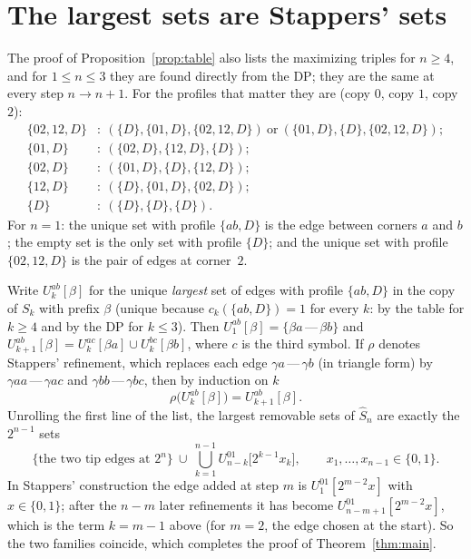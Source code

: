 \documentclass[11pt]{amsart}
\theoremstyle{remark}
\newcommand{\Sh}{\widehat S}
\begin{document}
\section{The largest sets are Stappers' sets}
The proof of Proposition~\ref{prop:table} also lists the maximizing triples for $n\ge4$, and for $1\le n\le3$
they are found directly from the DP; they are the same at every step $n\to n+1$. For the profiles that matter
they are (copy $0$, copy $1$, copy $2$):
\begin{align*}
\{02,12,D\}&:\ (\{D\},\{01,D\},\{02,12,D\})\ \text{or}\ (\{01,D\},\{D\},\{02,12,D\});\\
\{01,D\}&:\ (\{02,D\},\{12,D\},\{D\});\\
\{02,D\}&:\ (\{01,D\},\{D\},\{12,D\});\\
\{12,D\}&:\ (\{D\},\{01,D\},\{02,D\});\\
\{D\}&:\ (\{D\},\{D\},\{D\}).
\end{align*}
For $n=1$: the unique set with profile $\{ab,D\}$ is the edge between corners $a$ and $b$; the empty set is the only
set with profile $\{D\}$; and the unique set with profile $\{02,12,D\}$ is the pair of edges at corner~$2$.

Write $U^{ab}_k[\beta]$ for the unique \emph{largest} set of edges with profile $\{ab,D\}$ in the copy of $S_k$ with
prefix $\beta$ (unique because $c_k(\{ab,D\})=1$ for every $k$: by the table for $k\ge4$ and by the DP for $k\le3$).
Then $U^{ab}_1[\beta]=\{\beta a\,\text{---}\,\beta b\}$ and
$U^{ab}_{k+1}[\beta]=U^{ac}_k[\beta a]\cup U^{bc}_k[\beta b]$, where $c$ is the third symbol. If $\rho$ denotes
Stappers' refinement, which replaces each edge $\gamma a\,\text{---}\,\gamma b$ (in triangle form) by
$\gamma aa\,\text{---}\,\gamma ac$ and $\gamma bb\,\text{---}\,\gamma bc$, then by induction on $k$
\[\rho\bigl(U^{ab}_k[\beta]\bigr)=U^{ab}_{k+1}[\beta].\]
Unrolling the first line of the list, the largest removable sets of $\Sh_n$ are exactly the $2^{n-1}$ sets
\[\{\text{the two tip edges at }2^n\}\ \cup\ \bigcup_{k=1}^{n-1}U^{01}_{n-k}\bigl[2^{k-1}x_k\bigr],\qquad x_1,\dots,x_{n-1}\in\{0,1\}.\]
In Stappers' construction the edge added at step $m$ is $U^{01}_1[2^{m-2}x]$ with $x\in\{0,1\}$; after the
$n-m$ later refinements it has become $U^{01}_{n-m+1}[2^{m-2}x]$, which is the term $k=m-1$ above (for $m=2$, the
edge chosen at the start). So the two families coincide, which completes the proof of Theorem~\ref{thm:main}.
\end{document}
